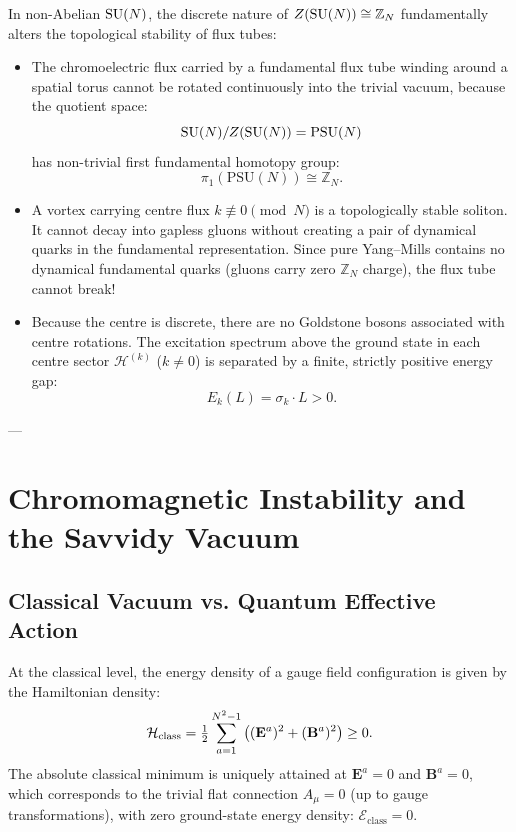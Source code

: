 In non-Abelian $\mathrm{SU}(N)$, the discrete nature of $Z(\mathrm{SU}(N)) \cong \mathbb{Z}_N$ fundamentally alters the topological stability of flux tubes:
\begin{itemize}
    \item The chromoelectric flux carried by a fundamental flux tube winding around a spatial torus cannot be rotated continuously into the trivial vacuum, because the quotient space:
    \begin{equation}
    \mathrm{SU}(N) / Z(\mathrm{SU}(N)) = \mathrm{PSU}(N)
    \end{equation}
    has non-trivial first fundamental homotopy group:
    \begin{equation}
    \pi_1(\mathrm{PSU}(N)) \cong \mathbb{Z}_N.
    \end{equation}
    \item A vortex carrying centre flux $k \not\equiv 0 \pmod N$ is a topologically stable soliton. It cannot decay into gapless gluons without creating a pair of dynamical quarks in the fundamental representation. Since pure Yang--Mills contains no dynamical fundamental quarks (gluons carry zero $\mathbb{Z}_N$ charge), the flux tube cannot break!
    \item Because the centre is discrete, there are no Goldstone bosons associated with centre rotations. The excitation spectrum above the ground state in each centre sector $\mathcal{H}^{(k)}$ ($k \ne 0$) is separated by a finite, strictly positive energy gap:
    \begin{equation}
    E_k(L) = \sigma_k \cdot L > 0.
    \end{equation}
\end{itemize}

---

\section{Chromomagnetic Instability and the Savvidy Vacuum}
\label{sec:savvidy_vacuum}

\subsection{Classical Vacuum vs. Quantum Effective Action}
\label{subsec:classical_vs_quantum_vacuum}

At the classical level, the energy density of a gauge field configuration is given by the Hamiltonian density:
\begin{equation}
\label{eq:ch10_hamiltonian_density}
\mathcal{H}_{\mathrm{class}} = \tfrac{1}{2} \sum_{a=1}^{N^2-1} \left( (\mathbf{E}^a)^2 + (\mathbf{B}^a)^2 \right) \ge 0.
\end{equation}
The absolute classical minimum is uniquely attained at $\mathbf{E}^a = 0$ and $\mathbf{B}^a = 0$, which corresponds to the trivial flat connection $A_\mu = 0$ (up to gauge transformations), with zero ground-state energy density: $\mathcal{E}_{\mathrm{class}} = 0$.

